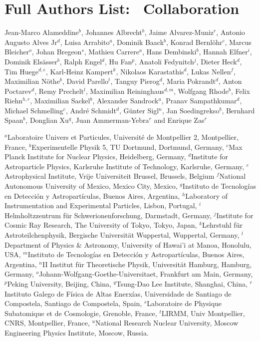 \clearpage

\section*{Full Authors List: \Coll\ Collaboration}
\scriptsize
\noindent
Jean-Marco Alameddine$^{b}$,
Johannes Albrecht$^{b}$,
Jaime Alvarez-Muniz$^{r}$,
Antonio Augusto Alves Jr$^{d}$,
Luisa Arrabito$^{a}$,
Dominik Baack$^{b}$,
Konrad Bernlöhr$^{c}$,
Marcus Bleicher$^{o}$,
Johan Bregeon$^{s}$,
Mathieu Carrere$^{a}$,
Hans Dembinski$^{b}$,
Hannah Elfner$^{i}$,
Dominik Elsässer$^{b}$,
Ralph Engel$^{d}$,
Hu Fan$^{p}$,
Anatoli Fedynitch$^{j}$,
Dieter Heck$^{d}$,
Tim Huege$^{d,e}$,
Karl-Heinz Kampert$^{k}$,
Nikolaos Karastathis$^{d}$,
Lukas Nellen$^{f}$,
Maximilian Nöthe$^{b}$,
David Parello$^{t}$,
Tanguy Pierog$^{d}$,
Maria Pokrandt$^{d}$,
Anton Poctarev$^{d}$,
Remy Prechelt$^{l}$,
Maximilian Reininghaus$^{d,m}$,
Wolfgang Rhode$^{b}$,
Felix Riehn$^{h,r}$,
Maximilian Sackel$^{b}$,
Alexander Sandrock$^{u}$,
Pranav Sampathkumar$^{d}$,
Michael Schmelling$^{c}$,
André Schmidt$^{d}$,
Günter Sigl$^{n}$,
Jan Soedingrekso$^{b}$,
Bernhard Spaan$^{b}$,
Donglian Xu$^{q}$,
Juan Ammerman-Yebra$^{r}$
and
Enrique Zas$^{r}$

\noindent
$^a$Laboratoire Univers et Particules, Université de Montpellier 2, Montpellier, France,
$^b$Experimentelle Physik 5, TU Dortmund, Dortmund, Germany, 
$^c$Max Planck Institute for Nuclear Physics, Heidelberg, Germany,
$^d$Institute for Astroparticle Physics, Karlsruhe Institute of Technology, Karlsruhe, Germany,
$^e$Astrophysical Institute, Vrije Universiteit Brussel, Brussels, Belgium
$^f$National Autonomous University of Mexico, Mexico City, Mexico,
$^g$Instituto de Tecnologías en Detección y Astropartículas, Buenos Aires, Argentina,
$^h$Laboratory of Instrumentation and Experimental Particles, Lisbon, Portugal,
$^i$Helmholtzzentrum für Schwerionenforschung, Darmstadt, Germany,
$^j$Institute for Cosmic Ray Research, The University of Tokyo, Tokyo, Japan,
$^k$Lehrstuhl für Astroteilchenphysik, Bergische Universität Wuppertal, Wuppertal, Germany,
$^l$Department of Physics & Astronomy, University of Hawai'i at Manoa, Honolulu, USA,
$^m$Instituto de Tecnologías en Detección y Astropartículas, Buenos Aires, Argentina,
$^n$II Institut für Theoretische Physik, Universität Hamburg, Hamburg, Germany,
$^o$Johann-Wolfgang-Goethe-Universitaet, Frankfurt am Main, Germany,
$^p$Peking University, Beijing, China,
$^q$Tsung-Dao Lee Institute, Shanghai, China,
$^r$Instituto Galego de Física de Altas Enerxías, Universidade de Santiago de Compostela, Santiago de Compostela, Spain,
$^s$Laboratoire de Physique Subatomique et de Cosmologie, Grenoble, France,
$^t$LIRMM, Univ Montpellier, CNRS, Montpellier, France,
$^u$National Research Nuclear University, Moscow Engineering Physics Institute, Moscow, Russia.